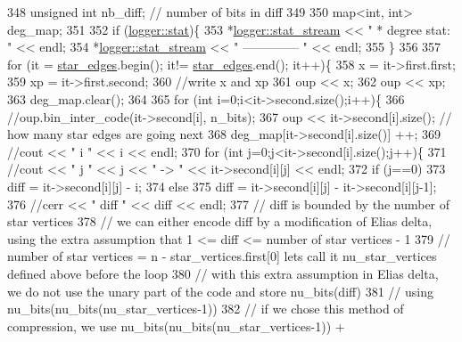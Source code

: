 \begin{DoxyCode}
348   \textcolor{keywordtype}{unsigned} \textcolor{keywordtype}{int} nb\_diff; \textcolor{comment}{// number of bits in diff}
349 
350   map<int, int> deg\_map;
351 
352   \textcolor{keywordflow}{if} (\hyperlink{classlogger_a26812b5ba03f130e8dae3446d5fc032f}{logger::stat})\{
353     *\hyperlink{classlogger_a7db37821f875f2ba3540980b355779f5}{logger::stat\_stream} << \textcolor{stringliteral}{" * degree stat: "} << endl;
354     *\hyperlink{classlogger_a7db37821f875f2ba3540980b355779f5}{logger::stat\_stream} << \textcolor{stringliteral}{" -------------- "} << endl;
355   \}
356 
357   \textcolor{keywordflow}{for} (it = \hyperlink{classmarked__graph__compressed_a7df5779d313486644132bd816937f532}{star\_edges}.begin(); it!= \hyperlink{classmarked__graph__compressed_a7df5779d313486644132bd816937f532}{star\_edges}.end(); it++)\{
358     x = it->first.first;
359     xp = it->first.second;
360     \textcolor{comment}{//write x and xp}
361     oup << x;
362     oup << xp;
363     deg\_map.clear();
364 
365     \textcolor{keywordflow}{for} (\textcolor{keywordtype}{int} i=0;i<it->second.size();i++)\{
366       \textcolor{comment}{//oup.bin\_inter\_code(it->second[i], n\_bits);}
367       oup << it->second[i].size(); \textcolor{comment}{// how many star edges are going next}
368       deg\_map[it->second[i].size()] ++;
369       \textcolor{comment}{//cout << " i " << i << endl;}
370       \textcolor{keywordflow}{for} (\textcolor{keywordtype}{int} j=0;j<it->second[i].size();j++)\{
371         \textcolor{comment}{//cout << " j " << j << " -> " << it->second[i][j] << endl;}
372         \textcolor{keywordflow}{if} (j==0)
373           diff = it->second[i][j] - i;
374         \textcolor{keywordflow}{else}
375           diff = it->second[i][j] - it->second[i][j-1];
376         \textcolor{comment}{//cerr << " diff " << diff << endl;}
377         \textcolor{comment}{// diff is bounded by the number of star vertices}
378         \textcolor{comment}{// we can either encode diff by a modification of Elias delta, using the extra assumption that 1 <=
       diff <= number of star vertices - 1}
379         \textcolor{comment}{// number of star vertices = n - star\_vertices.first[0] lets call it nu\_star\_vertices defined above
       before the loop}
380         \textcolor{comment}{// with this extra assumption in Elias delta, we do not use the unary part of the code and store
       nu\_bits(diff) }
381         \textcolor{comment}{// using nu\_bits(nu\_bits(nu\_star\_vertices-1))}
382         \textcolor{comment}{// if we chose this method of compression, we use nu\_bits(nu\_bits(nu\_star\_vertices-1)) +
}
\end{DoxyCode}
